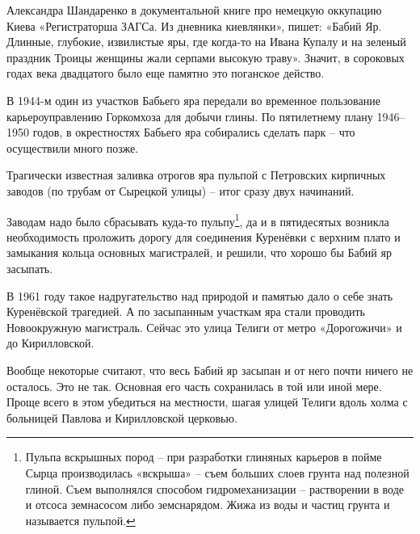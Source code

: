 Александра Шандаренко в документальной книге про немецкую оккупацию Киева «Регистраторша ЗАГСа. Из дневника киевлянки», пишет: «Бабий Яр. Длинные, глубокие, извилистые яры, где когда-то на Ивана Купалу и на зеленый праздник Троицы женщины жали серпами высокую траву». Значит, в сороковых годах века двадцатого было еще памятно это поганское действо.

В 1944-м один из участков Бабьего яра передали во временное пользование карьероуправлению Горкомхоза для добычи глины. По пятилетнему плану 1946–1950 годов, в окрестностях Бабьего яра собирались сделать парк – что осуществили много позже. 

Трагически известная заливка отрогов яра пульпой с Петровских кирпичных заводов (по трубам от Сырецкой улицы) – итог сразу двух начинаний.

Заводам надо было сбрасывать куда-то пульпу\footnote{Пульпа вскрышных пород – при разработки глиняных карьеров в пойме Сырца производилась «вскрыша» – съем больших слоев грунта над полезной глиной. Съем выполнялся способом гидромеханизации – растворении в воде и отсоса земнасосом либо земснарядом. Жижа из воды и частиц грунта и называется пульпой.}, да и  в пятидесятых возникла необходимость проложить дорогу для соединения Куренёвки с верхним плато и замыкания кольца основных магистралей, и решили, что хорошо бы Бабий яр засыпать.




В 1961 году такое надругательство над природой и памятью дало о себе знать Куренёвской трагедией. А по засыпанным участкам яра стали проводить Новоокружную магистраль. Сейчас это улица Телиги от метро «Дорогожичи» и до Кирилловской. 

Вообще некоторые считают, что весь Бабий яр засыпан и от него почти ничего не осталось. Это не так. Основная его часть сохранилась в той или иной мере. Проще всего в этом убедиться на местности, шагая улицей Телиги вдоль холма с больницей Павлова и Кирилловской церковью.

